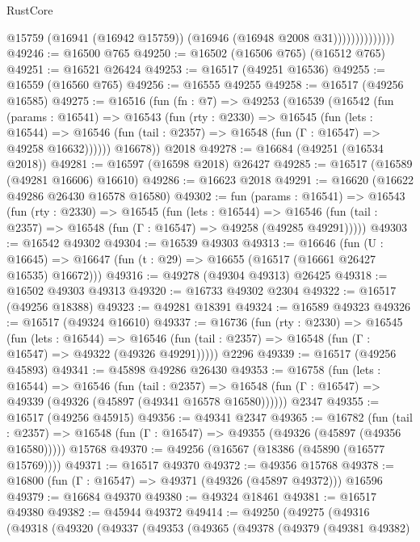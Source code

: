 \begin{lexlean}{RustCore}
\begin{coremodule}
                            @15759
                            (@16941 (@16942 @15759))
                            (@16946 (@16948 @2008 @31))))))))))))))
@49246 := @16500 @765
@49250 := @16502 (@16506 @765) (@16512 @765)
@49251 := @16521 @26424
@49253 := @16517 (@49251 @16536)
@49255 := @16559 (@16560 @765)
@49256 := @16555 @49255
@49258 := @16517 (@49256 @16585)
@49275 := @16516
    (fun (fn : @7) =>
    @49253
      (@16539
        (@16542
          (fun (params : @16541) =>
          @16543
            (fun (rty : @2330) =>
            @16545
              (fun (lets : @16544) =>
              @16546 (fun (tail : @2357) => @16548 (fun (Γ : @16547) => @49258 @16632))))))
        @16678))
    @2018
@49278 := @16684 (@49251 (@16534 @2018))
@49281 := @16597 (@16598 @2018) @26427
@49285 := @16517 (@16589 (@49281 @16606) @16610)
@49286 := @16623 @2018
@49291 := @16620 (@16622 @49286 @26430 @16578 @16580)
@49302 := fun (params : @16541) =>
  @16543
    (fun (rty : @2330) =>
    @16545
      (fun (lets : @16544) =>
      @16546 (fun (tail : @2357) => @16548 (fun (Γ : @16547) => @49258 (@49285 @49291)))))
@49303 := @16542 @49302
@49304 := @16539 @49303
@49313 := @16646
    (fun (U : @16645) => @16647 (fun (t : @29) => @16655 (@16517 (@16661 @26427 @16535) @16672)))
@49316 := @49278 (@49304 @49313) @26425
@49318 := @16502 @49303 @49313
@49320 := @16733 @49302 @2304
@49322 := @16517 (@49256 @18388)
@49323 := @49281 @18391
@49324 := @16589 @49323
@49326 := @16517 (@49324 @16610)
@49337 := @16736
    (fun (rty : @2330) =>
    @16545
      (fun (lets : @16544) =>
      @16546 (fun (tail : @2357) => @16548 (fun (Γ : @16547) => @49322 (@49326 @49291)))))
    @2296
@49339 := @16517 (@49256 @45893)
@49341 := @45898 @49286 @26430
@49353 := @16758
    (fun (lets : @16544) =>
    @16546
      (fun (tail : @2357) =>
      @16548 (fun (Γ : @16547) => @49339 (@49326 (@45897 (@49341 @16578 @16580))))))
    @2347
@49355 := @16517 (@49256 @45915)
@49356 := @49341 @2347
@49365 := @16782
    (fun (tail : @2357) => @16548 (fun (Γ : @16547) => @49355 (@49326 (@45897 (@49356 @16580)))))
    @15768
@49370 := @49256 (@16567 (@18386 (@45890 (@16577 @15769))))
@49371 := @16517 @49370
@49372 := @49356 @15768
@49378 := @16800 (fun (Γ : @16547) => @49371 (@49326 (@45897 @49372))) @16596
@49379 := @16684 @49370
@49380 := @49324 @18461
@49381 := @16517 @49380
@49382 := @45944 @49372
@49414 := @49250
    (@49275
      (@49316
        (@49318
          (@49320
            (@49337
              (@49353
                (@49365
                  (@49378
                    (@49379
                      (@49381 @49382)

\end{coremodule}
\end{lexlean}
